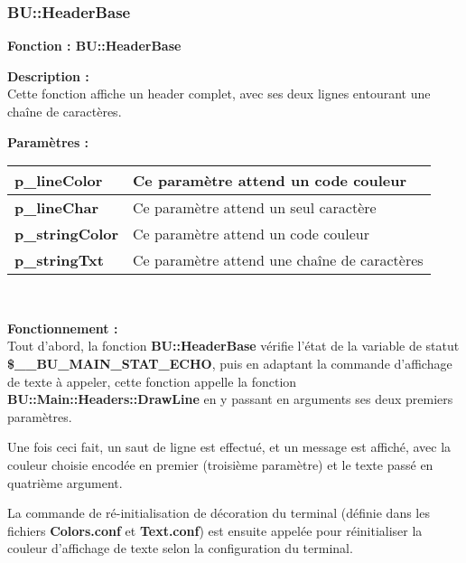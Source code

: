 \documentclass[a4paper,10pt]{article}
\begin{document}
\color{blue}
\subsubsection{BU::HeaderBase}\color{white}

\textbf{Fonction : \color{mauve}BU::HeaderBase}\\[1\baselineskip]

\begin{justify}
    \textbf{Description :}\\
    Cette fonction affiche un header complet, avec ses deux lignes entourant une chaîne de caractères.
\end{justify}

\textbf{Paramètres :}\\[1\baselineskip]
\begin{tabular}{|l|l|}
\hline 
\textbf{\color{orange}p\_lineColor} & Ce paramètre attend un code couleur \\ 
\hline 
\textbf{\color{orange}p\_lineChar} & Ce paramètre attend un seul caractère \\ 
\hline 
\textbf{\color{orange}p\_stringColor} & Ce paramètre attend un code couleur \\ 
\hline 
\textbf{\color{orange}p\_stringTxt} & Ce paramètre attend une chaîne de caractères\\ 
\hline 
\end{tabular}\\[1\baselineskip]

\begin{justify}
    \textbf{Fonctionnement :}\\
    Tout d'abord, la fonction \textbf{\color{mauve}BU::HeaderBase} vérifie l'état de la variable de statut \textbf{\color{orange}\$\_\_BU\_MAIN\_STAT\_ECHO}, puis en adaptant la commande d'affichage de texte à appeler, cette fonction appelle la fonction \textbf{\color{mauve}BU::Main::Headers::DrawLine} en y passant en arguments ses deux premiers paramètres.
\end{justify}

\begin{justify}
    Une fois ceci fait, un saut de ligne est effectué, et un message est affiché, avec la couleur choisie encodée en premier (troisième paramètre) et le texte passé en quatrième argument.
\end{justify}

\begin{justify}
    La commande de ré-initialisation de décoration du terminal (définie dans les fichiers \textbf{\color{lime}Colors.conf} et \textbf{\color{lime}Text.conf}) est ensuite appelée pour réinitialiser la couleur d'affichage de texte selon la configuration du terminal.
\end{justify}
\end{document}

